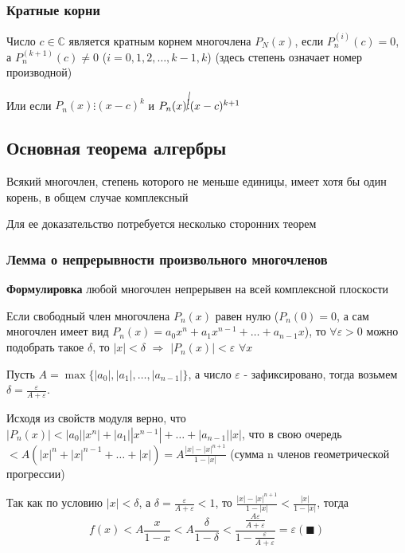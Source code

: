 \documentclass[class=article,a4paper,12pt,crop=false]{standalone}
\begin{document}
\subsubsection{Кратные корни}

Число $c \in \mathbb{C}$ является кратным корнем многочлена $P_N(x)$, если
$P_n^{(i)}(c) = 0$, а $P_n^{(k + 1)}(c) \neq 0$ ($i = 0, 1, 2, \dots, k - 1, k$) (здесь
степень означает номер производной)

Или если $P_n(x) \vdots (x - c)^k$ и $P_n(x)\cancel{\vdots}(x - c)^{k + 1}$

\subsection{Основная теорема алгербры}

Всякий многочлен, степень которого не меньше единицы, имеет хотя бы один корень, в общем случае комплексный

Для ее доказательство потребуется несколько сторонних теорем
\subsubsection{Лемма о непрерывности произвольного многочленов}

\textbf{Формулировка} любой многочлен непрерывен на всей комплексной плоскости

Если свободный член многочлена $P_n(x)$ равен нулю ($P_n(0) = 0$, а сам многочлен
имеет вид $P_n(x) = a_0x^n + a_1x^{n - 1} + \dots + a_{n - 1}x$), то $\forall \varepsilon > 0$
можно подобрать такое $\delta$, то $|x| < \delta$ $\Rightarrow$ $|P_n(x)| < \varepsilon$ $\forall x$

Пусть $A = \max\{|a_0|, |a_1|, \dots, |a_{n - 1}|\}$, а число $\varepsilon$ - зафиксировано,
тогда возьмем $\delta = \frac{\varepsilon}{A + \varepsilon}$.

Исходя из свойств модуля верно, что $|P_n(x)| < |a_0||x^n| + |a_1||x^{n - 1}| + \dots + |a_{n - 1}||x|$, что
в свою очередь $< A(|x|^n + |x|^{n - 1} + \dots + |x|) = A\frac{|x| - |x|^{n + 1}}{1 - |x|}$
(сумма n членов геометрической прогрессии)

Так как по условию $|x| < \delta$, а $\delta = \frac{\varepsilon}{A + \varepsilon} < 1$,
то $\frac{|x| - |x|^{n + 1}}{1 - |x|} < \frac{|x|}{1 - |x|}$, тогда
\begin{equation}
    f(x) < A\frac{x}{1 - x} < A\frac{\delta}{1 - \delta} <
    \frac{\frac{A\varepsilon}{A + \varepsilon}}{1 - \frac{\varepsilon}{A + \varepsilon}} = \varepsilon (\blacksquare)
\end{equation}
\end{document}
